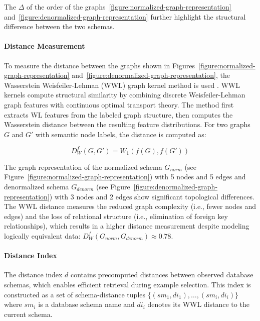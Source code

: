 The $\Delta$ of the order of the
graphs~\ref{figure:normalized-graph-representation}
and~\ref{figure:denormalized-graph-representation} further highlight the
structural difference between the two schemas.

\paragraph{Distance Measurement}

To measure the distance between the graphs shown
in Figures~\ref{figure:normalized-graph-representation}
and~\ref{figure:denormalized-graph-representation}, the Wasserstein
Weisfeiler-Lehman (WWL) graph kernel method is used \citep{WWL}. WWL kernels
compute structural similarity by combining discrete Weisfeiler-Lehman graph
features with continuous optimal transport theory. The method first extracts WL
features from the labeled graph structure, then computes the Wasserstein
distance between the resulting feature distributions. For two graphs $G$ and
$G'$ with semantic node labels, the distance is computed as:

\begin{equation}
D^{f}_{W}(G, G') = W_1(f(G), f(G'))
\end{equation}

The graph representation of the normalized schema $G_{norm}$ (see
Figure~\ref{figure:normalized-graph-representation}) with 5 nodes and 5 edges
and denormalized schema $G_{denorm}$ (see
Figure~\ref{figure:denormalized-graph-representation}) with 3 nodes and 2 edges
show significant topological differences. The WWL distance measures the
reduced graph complexity (i.e., fewer nodes and edges) and the loss of
relational structure (i.e., elimination of foreign key relationships),
which results in a higher distance measurement despite modeling logically
equivalent data: $D^{f}_{W}(G_{norm}, G_{denorm}) \approx 0.78$.

\paragraph{Distance Index}

The distance index $d$ contains precomputed distances between observed
database schemas, which enables efficient retrieval during example
selection. This index is constructed as a set of schema-distance tuples
$\{(sm_1, di_1), \ldots, (sm_i, di_i)\}$ where $sm_i$ is a database schema name
and $di_i$ denotes its WWL distance to the current schema.

